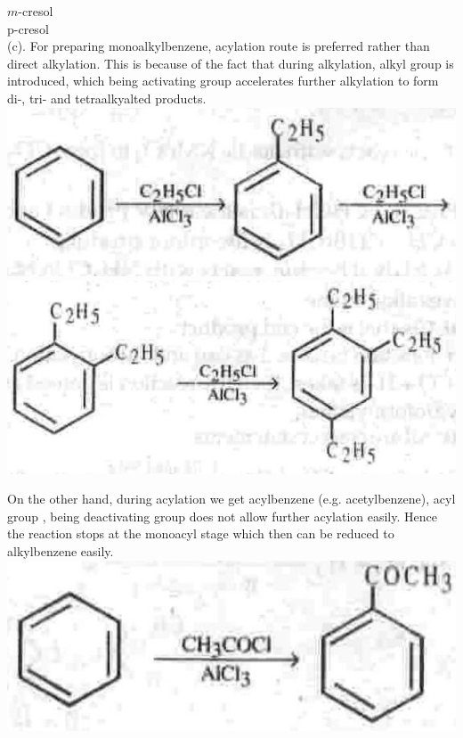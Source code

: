 \documentclass[10pt]{article}
\begin{document}
$m$-cresol\\
p-cresol\\
(c). For preparing monoalkylbenzene, acylation route is preferred rather than direct alkylation. This is because of the fact that during alkylation, alkyl group is introduced, which being activating group accelerates further alkylation to form di-, tri- and tetraalkyalted products.\\
\includegraphics[max width=\textwidth, center]{2025_01_28_8470952b98110cec3aabg-244(9)}\\
\includegraphics[max width=\textwidth, center]{2025_01_28_8470952b98110cec3aabg-244(7)}

On the other hand, during acylation we get acylbenzene (e.g. acetylbenzene), acyl group , being deactivating group does not allow further acylation easily. Hence the reaction stops at the monoacyl stage which then can be reduced to alkylbenzene easily.\\
\includegraphics[max width=\textwidth, center]{2025_01_28_8470952b98110cec3aabg-244(11)}
\end{document}
